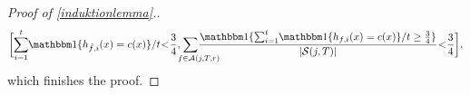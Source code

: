 \begin{proof}[Proof of \cref{induktionlemma}.]
\begin{align*}
        \bigg[
          \negmedspace \sum_{i=1}^{t}\negmedspace  \ind\{h_{\tilde{f},i}(x)=c(x)\}/t\negmedspace <\negmedspace \frac{3}{4},
      \negmedspace \negmedspace  \negmedspace  \negmedspace \negmedspace  \negmedspace \negmedspace \negmedspace \negmedspace\sum_{\text{\quad\quad}f\in \cA(j,T,r)} \negmedspace \negmedspace \negmedspace \negmedspace\negmedspace \negmedspace  \negmedspace \negmedspace \negmedspace \negmedspace \frac{\ind\{\sum_{i=1}^{t}\negmedspace  \ind\{h_{f,i}(x)=c(x)\}/t\geq \frac{3}{4}\}}{|\cS(j,T)|}
      \negmedspace<\negmedspace\frac{3}{4}\bigg],
      \end{align*}
      which finishes the proof. 
    \end{proof}
    
